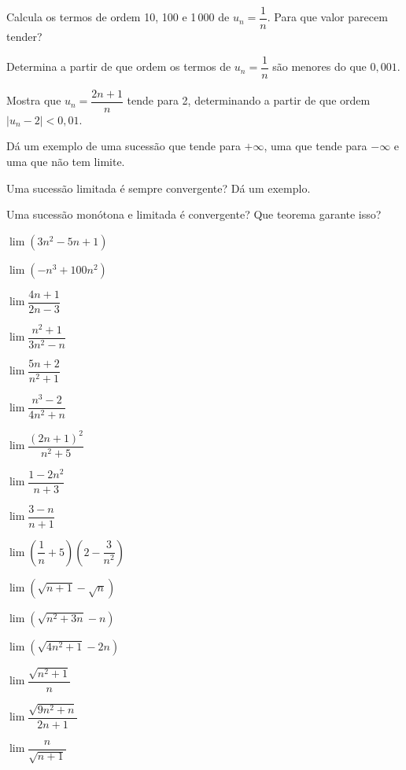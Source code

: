 \documentclass[12pt]{article}
\begin{document}


\begin{exercicios}
  \item Calcula os termos de ordem 10, 100 e 1\,000 de $u_n = \dfrac{1}{n}$. Para que valor parecem tender?
  \item Determina a partir de que ordem os termos de $u_n = \dfrac{1}{n}$ são menores do que $0{,}001$.
  \item Mostra que $u_n = \dfrac{2n + 1}{n}$ tende para 2, determinando a partir de que ordem $|u_n - 2| < 0{,}01$.
  \item Dá um exemplo de uma sucessão que tende para $+\infty$, uma que tende para $-\infty$ e uma que não tem limite.
  \item Uma sucessão limitada é sempre convergente? Dá um exemplo.
  \item Uma sucessão monótona e limitada é convergente? Que teorema garante isso?
\end{exercicios}

\begin{exercicios}
  \item $\lim (3n^2 - 5n + 1)$
  \item $\lim (-n^3 + 100n^2)$
  \item $\lim \dfrac{4n + 1}{2n - 3}$
  \item $\lim \dfrac{n^2 + 1}{3n^2 - n}$
  \item $\lim \dfrac{5n + 2}{n^2 + 1}$
  \item $\lim \dfrac{n^3 - 2}{4n^2 + n}$
  \item $\lim \dfrac{(2n + 1)^2}{n^2 + 5}$
  \item $\lim \dfrac{1 - 2n^2}{n + 3}$
  \item $\lim \dfrac{3 - n}{n + 1}$
  \item $\lim \left(\dfrac{1}{n} + 5\right)\left(2 - \dfrac{3}{n^2}\right)$
\end{exercicios}

\begin{exercicios}
  \item $\lim \left(\sqrt{n + 1} - \sqrt{n}\right)$
  \item $\lim \left(\sqrt{n^2 + 3n} - n\right)$
  \item $\lim \left(\sqrt{4n^2 + 1} - 2n\right)$
  \item $\lim \dfrac{\sqrt{n^2 + 1}}{n}$
  \item $\lim \dfrac{\sqrt{9n^2 + n}}{2n + 1}$
  \item $\lim \dfrac{n}{\sqrt{n + 1}}$
\end{exercicios}
\end{document}

